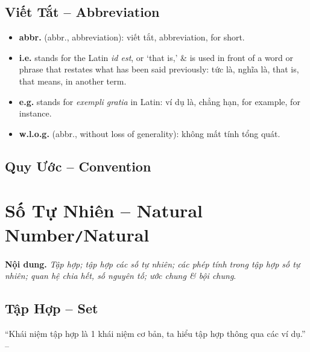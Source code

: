 \documentclass{article}
\numberwithin{equation}{section}
\begin{document}
\subsection*{Viết Tắt -- Abbreviation}
\begin{itemize}
	\item \textbf{abbr.} (abbr., abbreviation): viết tắt, abbreviation, for short.
	\item \textbf{i.e.} stands for the Latin \textit{id est}, or `that is,' \& is used in front of a word or phrase that restates what has been said previously: tức là, nghĩa là, that is, that means, in another term.
	\item \textbf{e.g.} stands for \textit{exempli gratia} in Latin: ví dụ là, chẳng hạn, for example, for instance.
	\item \textbf{w.l.o.g.} (abbr., without loss of generality): không mất tính tổng quát.
\end{itemize}

\subsection*{Quy Ước -- Convention}


\section{Số Tự Nhiên -- Natural Number\texttt{/}Natural}
\textbf{Nội dung.} \textit{Tập hợp; tập hợp các số tự nhiên; các phép tính trong tập hợp số tự nhiên; quan hệ chia hết, số nguyên tố; ước chung \textit{\&} bội chung}.

\subsection{Tập Hợp -- Set}
``Khái niệm tập hợp là 1 khái niệm cơ bản, ta hiểu tập hợp thông qua các ví dụ.'' -- \cite[p. 4]{Binh_Toan_6_tap_1}
\end{document}
